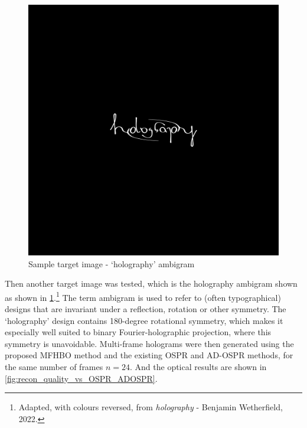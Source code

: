 	\begin{figure}[h!t]
		\centering
		\includegraphics[width=0.5\linewidth]{holography_ambigram_smaller.png}
		\caption{Sample target image - `holography' ambigram}
		\label{fig:holography_ambigram_smaller}
	\end{figure}
	
	Then another target image was tested, which is the holography ambigram shown  as shown in \cref{fig:holography_ambigram_smaller}.\footnote{Adapted, with colours reversed, from  \emph{holography} - Benjamin Wetherfield, 2022.} The term ambigram is used to refer to (often typographical) designs that are invariant under a reflection, rotation or other symmetry. The `holography' design contains 180-degree rotational symmetry, which makes it especially well suited to binary Fourier-holographic projection, where this symmetry is unavoidable. Multi-frame holograms were then generated using the proposed MFHBO method and the existing OSPR and AD-OSPR methods, for the same number of frames $n=24$. And the optical results are shown in \cref{fig:recon_quality_vs_OSPR_ADOSPR}.
	
